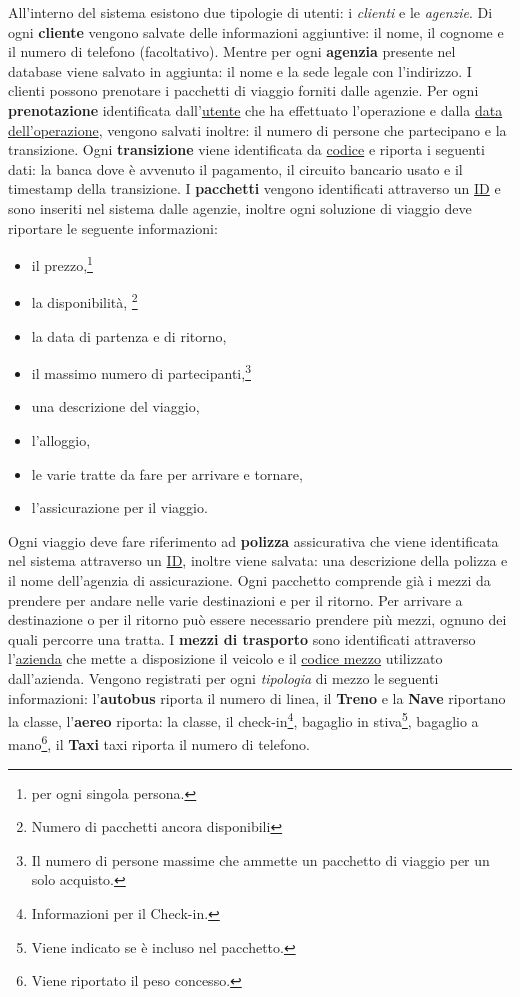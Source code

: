 %
%
All'interno del sistema esistono due tipologie di utenti: i \emph{clienti} e le \emph{agenzie}. Di ogni \textbf{cliente} vengono salvate delle informazioni aggiuntive: il nome, il cognome e il numero di telefono (facoltativo). Mentre per ogni \textbf{agenzia} presente nel database viene salvato in aggiunta: il nome e la sede legale con l'indirizzo.
%
%
I clienti possono prenotare i pacchetti di viaggio forniti dalle agenzie. Per ogni \textbf{prenotazione} identificata dall'\underline{utente} che ha effettuato l'operazione e dalla \underline{data dell'operazione}, vengono salvati inoltre: il numero di persone che partecipano e la transizione.
%
%
Ogni \textbf{transizione} viene identificata da \underline{codice} e riporta i seguenti dati: la banca dove è avvenuto il pagamento, il circuito bancario usato e il timestamp della transizione.
%
%
I \textbf{pacchetti} vengono identificati attraverso un \underline{ID} e sono inseriti nel sistema dalle agenzie, inoltre ogni soluzione di viaggio deve riportare le seguente informazioni:
\begin{multicols}{3}
\begin{itemize}
    \item il prezzo,\footnote{per ogni singola persona.}
    \item la disponibilità, \footnote{Numero di pacchetti ancora disponibili}
    \item la data di partenza e di ritorno,
    \item il massimo numero di partecipanti,\footnote{Il numero di persone massime che ammette un pacchetto di viaggio per un solo acquisto.}
    \item una descrizione del viaggio,
    \item l'alloggio,
    \item le varie tratte da fare per arrivare e tornare,
    \item l'assicurazione per il viaggio.
\end{itemize}
\end{multicols}
Ogni viaggio deve fare riferimento ad \textbf{polizza} assicurativa che viene identificata nel sistema attraverso un \underline{ID}, inoltre viene salvata: una descrizione della polizza e il nome dell'agenzia di assicurazione.
%
%
Ogni pacchetto comprende già i mezzi da prendere per andare nelle varie destinazioni e per il ritorno. Per arrivare a destinazione o per il ritorno può essere necessario prendere più mezzi, ognuno dei quali percorre una tratta. I \textbf{mezzi di trasporto} sono identificati attraverso l'\underline{azienda} che mette a disposizione il veicolo e il \underline{codice mezzo} utilizzato dall'azienda. Vengono registrati per ogni \emph{tipologia} di mezzo le seguenti informazioni:
l'\textbf{autobus} riporta il numero di linea,
il \textbf{Treno} e la \textbf{Nave} riportano la classe,
l'\textbf{aereo} riporta:
la classe,
il check-in\footnote{Informazioni per il Check-in.},
bagaglio in stiva\footnote{Viene indicato se è incluso nel pacchetto.},
bagaglio a mano\footnote{Viene riportato il peso concesso.},
%
il \textbf{Taxi} taxi riporta il numero di telefono.


